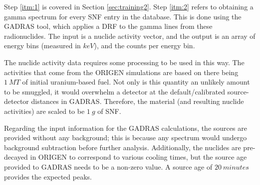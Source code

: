 Step \ref{itm:1} is covered in Section \ref{sec:training2}.  Step \ref{itm:2}
refers to obtaining a gamma spectrum for every \gls{SNF} entry in the database.
This is done using the \gls{GADRAS} tool, which applies a \gls{DRF} to the
gamma lines from these radionuclides. The input is a nuclide activity vector,
and the output is an array of energy bins (measured in $keV$), and the counts
per energy bin.

The nuclide activity data requires some processing to be used in this way.  The
activities that come from the \gls{ORIGEN} simulations are based on there being
$1\:MT$ of initial uranium-based fuel. Not only is this quantity an unlikely
amount to be smuggled, it would overwhelm a detector at the default/calibrated
source-detector distances in \gls{GADRAS}.  Therefore, the material (and
resulting nuclide activities) are scaled to be $1\:g$ of \gls{SNF}.

Regarding the input information for the \gls{GADRAS} calculations, the sources
are provided without any background; this is because any spectrum would undergo
background subtraction before further analysis. Additionally, the nuclides are
pre-decayed in \gls{ORIGEN} to correspond to various cooling times, but the
source age provided to \gls{GADRAS} needs to be a non-zero value. A source age
of $20\:minutes$ provides the expected peaks.


